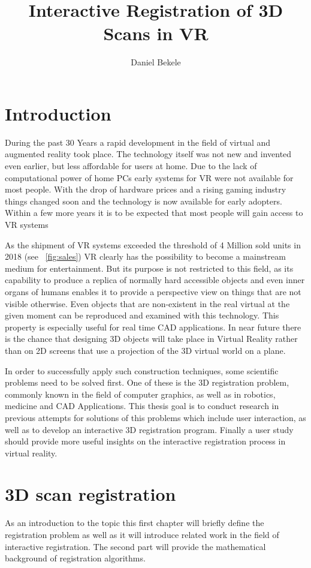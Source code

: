\documentclass[hyperref,english,bachelorofscience,bibnum,twoside]{cgvpub}
\author{Daniel Bekele}
\title{Interactive Registration of 3D Scans in VR}
\begin{document}
\chapter{Introduction}
During the past 30 Years a rapid development in the field of  virtual and augmented reality took place. The technology itself was not new and invented even earlier, but less affordable for users at home. Due to the lack of computational power of home PCs early systems for VR were not available for most people. With the drop of hardware prices and a rising gaming industry things changed soon and the technology is now available for early adopters. Within a few more years it is to be expected that most people will gain access to VR systems

As the shipment of VR systems exceeded the threshold of 4 Million sold units in 2018 (see ~\ref{fig:sales})\cite{statisticaVR18} VR clearly has the possibility to become a mainstream medium for entertainment. But its purpose is not restricted to this field, as its capability to produce a replica of normally hard accessible objects and even inner organs of humans enables it to provide a perspective view on things that are not visible otherwise. Even objects that are non-existent in the real virtual at the given moment can be reproduced and examined with this technology. This property is especially useful for real time CAD applications. In near future there is the chance that designing 3D objects will take place in Virtual Reality rather than on 2D screens that use a projection of the 3D virtual world on a plane.

In order to successfully apply such construction techniques, some scientific problems need to be solved first. One of these is the 3D registration problem, commonly known in the field of computer graphics, as well as in robotics, medicine and CAD Applications.
This thesis goal is to conduct research in previous attempts for solutions of this problems which include user interaction, as well as to develop an interactive 3D registration program. Finally a user study should provide more useful insights on the interactive registration process in virtual reality.

\chapter{3D scan registration}

As an introduction to the topic this first chapter will briefly define the registration problem as well as it will introduce related work in the field of interactive registration. The second part will provide the mathematical background of registration algorithms.
\end{document}
